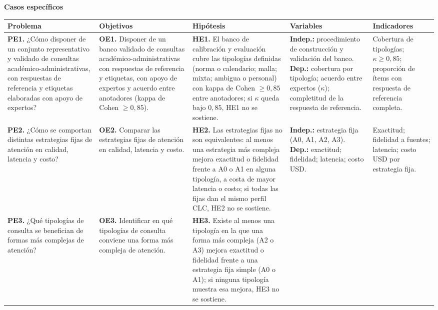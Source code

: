 \documentclass[10pt,a4paper,landscape]{article}
\begin{document}
\vspace{0.35em}
\noindent\textbf{\small Casos específicos}\\[0.18em]
{\scriptsize
\setlength{\tabcolsep}{3pt}
\renewcommand{\arraystretch}{1.28}
\begin{tabularx}{\linewidth}{|Y|Y|Y|Y|Y|}
\hline
\textbf{\footnotesize Problema} & \textbf{\footnotesize Objetivos} & \textbf{\footnotesize Hipótesis} & \textbf{\footnotesize Variables} & \textbf{\footnotesize Indicadores} \\
\hline
\textbf{PE1.} ¿Cómo disponer de un conjunto representativo y validado de consultas académico-administrativas, con respuestas de referencia y etiquetas elaboradas con apoyo de expertos? &
\textbf{OE1.} Disponer de un banco validado de consultas académico-administrativas con respuestas de referencia y etiquetas, con apoyo de expertos y acuerdo entre anotadores (kappa de Cohen $\geq 0{,}85$). &
\textbf{HE1.} El banco de calibración y evaluación cubre las tipologías definidas (norma o calendario; malla; mixta; ambigua o personal) con kappa de Cohen $\geq 0{,}85$ entre anotadores; si $\kappa$ queda bajo $0{,}85$, HE1 no se sostiene. &
\textbf{Indep.:} procedimiento de construcción y validación del banco. \textbf{Dep.:} cobertura por tipología; acuerdo entre expertos ($\kappa$); completitud de la respuesta de referencia. &
Cobertura de tipologías; $\kappa\geq 0{,}85$; proporción de ítems con respuesta de referencia completa. \\
\hline
\textbf{PE2.} ¿Cómo se comportan distintas estrategias fijas de atención en calidad, latencia y costo? &
\textbf{OE2.} Comparar las estrategias fijas de atención en calidad, latencia y costo. &
\textbf{HE2.} Las estrategias fijas no son equivalentes: al menos una estrategia más compleja mejora exactitud o fidelidad frente a A0 o A1 en alguna tipología, a costa de mayor latencia o costo; si todas las fijas dan el mismo perfil CLC, HE2 no se sostiene. &
\textbf{Indep.:} estrategia fija (A0, A1, A2, A3). \textbf{Dep.:} exactitud; fidelidad; latencia; costo USD. &
Exactitud; fidelidad a fuentes; latencia; costo USD por estrategia fija. \\
\hline
\textbf{PE3.} ¿Qué tipologías de consulta se benefician de formas más complejas de atención? &
\textbf{OE3.} Identificar en qué tipologías de consulta conviene una forma más compleja de atención. &
\textbf{HE3.} Existe al menos una tipología en la que una forma más compleja (A2 o A3) mejora exactitud o fidelidad frente a una estrategia fija simple (A0 o A1); si ninguna tipología muestra esa mejora, HE3 no se sostiene. &

\end{tabularx}}
\end{document}
